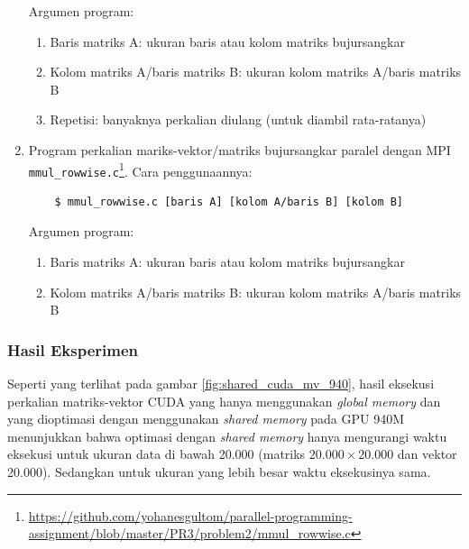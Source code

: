 \begin{enumerate}
	Argumen program:
	\begin{enumerate}
		\item Baris matriks A: ukuran baris atau kolom matriks bujursangkar
		\item Kolom matriks A/baris matriks B: ukuran kolom matriks A/baris matriks B
		\item Repetisi: banyaknya perkalian diulang (untuk diambil rata-ratanya)
	\end{enumerate}

	\item Program perkalian mariks-vektor/matriks bujursangkar paralel dengan MPI \verb|mmul_rowwise.c|\footnote{\url{https://github.com/yohanesgultom/parallel-programming-assignment/blob/master/PR3/problem2/mmul_rowwise.c}}. Cara penggunaannya:
	
	\begin{lstlisting}
	$ mmul_rowwise.c [baris A] [kolom A/baris B] [kolom B]
	\end{lstlisting}
	
	Argumen program:
	\begin{enumerate}
		\item Baris matriks A: ukuran baris atau kolom matriks bujursangkar
		\item Kolom matriks A/baris matriks B: ukuran kolom matriks A/baris matriks B
	\end{enumerate}
		
\end{enumerate}

\subsubsection{Hasil Eksperimen}

Seperti yang terlihat pada gambar \ref{fig:shared_cuda_mv_940}, hasil eksekusi perkalian matriks-vektor CUDA yang hanya menggunakan \textit{global memory} dan yang dioptimasi dengan menggunakan \textit{shared memory} pada GPU 940M menunjukkan bahwa optimasi dengan \textit{shared memory} hanya mengurangi waktu eksekusi untuk ukuran data di bawah 20.000 (matriks $20.000 \times 20.000$ dan vektor 20.000). Sedangkan untuk ukuran yang lebih besar waktu eksekusinya sama.

